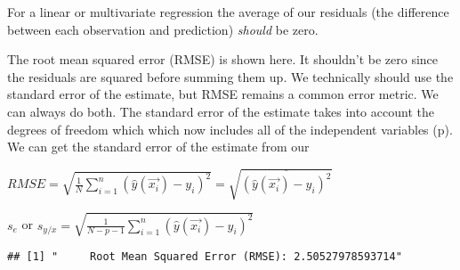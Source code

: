 \documentclass[]{article}
\newenvironment{Shaded}{\begin{snugshade}}{\end{snugshade}}
\newcommand{\CommentTok}[1]{\textcolor[rgb]{0.56,0.35,0.01}{\textit{#1}}}
\newcommand{\DecValTok}[1]{\textcolor[rgb]{0.00,0.00,0.81}{#1}}
\newcommand{\KeywordTok}[1]{\textcolor[rgb]{0.13,0.29,0.53}{\textbf{#1}}}
\newcommand{\NormalTok}[1]{#1}
\newcommand{\OperatorTok}[1]{\textcolor[rgb]{0.81,0.36,0.00}{\textbf{#1}}}
\newcommand{\StringTok}[1]{\textcolor[rgb]{0.31,0.60,0.02}{#1}}
\begin{document}
For a linear or multivariate regression the average of our residuals
(the difference between each observation and prediction) \emph{should}
be zero.

The root mean squared error (RMSE) is shown here. It shouldn't be zero
since the residuals are squared before summing them up. We technically
should use the standard error of the estimate, but RMSE remains a common
error metric. We can always do both. The standard error of the estimate
takes into account the degrees of freedom which which now includes all
of the independent variables (p). We can get the standard error of the
estimate from our

\(RMSE = \sqrt{ \frac{1}{N} \sum_{i=1}^{n} (\widehat{y}(\overrightarrow{x_i})-y_i)^2 } = \sqrt{\overline{(\widehat{y}(\overrightarrow{x_i})-y_i)^2} }\)

\(s_{e}\) or
\(s_{y/x} = \sqrt{ \frac{1}{N-p-1} \sum_{i=1}^{n} (\widehat{y}(\overrightarrow{x_i})-y_i)^2 }\)

\begin{Shaded}
\end{Shaded}

\begin{verbatim}
## [1] "     Root Mean Squared Error (RMSE): 2.50527978593714"
\end{verbatim}

\begin{Shaded}
\end{Shaded}
\end{document}
